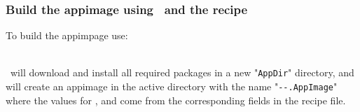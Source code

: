 \subsubsection*{Build the appimage using \abuild\ and the recipe}

To build the appimpage use:
{\footnotesize{
\begin{script}
 \abuild {} 
\end{script}
}}
\\[-0.5cm]
\abuild\ will download and install all required packages in a new "\texttt{AppDir}" directory, and will create an appimage in the active directory with the name "\texttt{-}\texttt{-}\texttt{.AppImage}" where the values for ,  and  come from the corresponding fields in the recipe file. 
